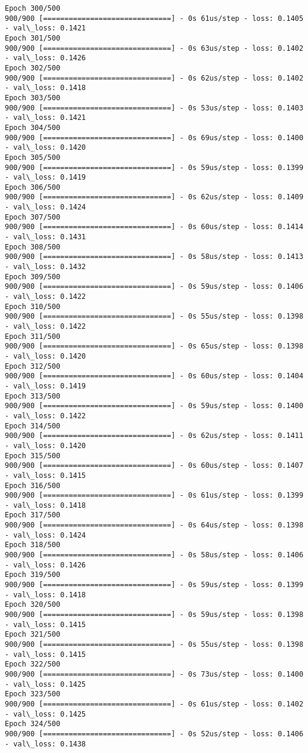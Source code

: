 \documentclass[11pt]{article}
\begin{document}
\begin{Verbatim}[commandchars=\\\{\}]
Epoch 300/500
900/900 [==============================] - 0s 61us/step - loss: 0.1405 - val\_loss: 0.1421
Epoch 301/500
900/900 [==============================] - 0s 63us/step - loss: 0.1402 - val\_loss: 0.1426
Epoch 302/500
900/900 [==============================] - 0s 62us/step - loss: 0.1402 - val\_loss: 0.1418
Epoch 303/500
900/900 [==============================] - 0s 53us/step - loss: 0.1403 - val\_loss: 0.1421
Epoch 304/500
900/900 [==============================] - 0s 69us/step - loss: 0.1400 - val\_loss: 0.1420
Epoch 305/500
900/900 [==============================] - 0s 59us/step - loss: 0.1399 - val\_loss: 0.1419
Epoch 306/500
900/900 [==============================] - 0s 62us/step - loss: 0.1409 - val\_loss: 0.1424
Epoch 307/500
900/900 [==============================] - 0s 60us/step - loss: 0.1414 - val\_loss: 0.1431
Epoch 308/500
900/900 [==============================] - 0s 58us/step - loss: 0.1413 - val\_loss: 0.1432
Epoch 309/500
900/900 [==============================] - 0s 59us/step - loss: 0.1406 - val\_loss: 0.1422
Epoch 310/500
900/900 [==============================] - 0s 55us/step - loss: 0.1398 - val\_loss: 0.1422
Epoch 311/500
900/900 [==============================] - 0s 65us/step - loss: 0.1398 - val\_loss: 0.1420
Epoch 312/500
900/900 [==============================] - 0s 60us/step - loss: 0.1404 - val\_loss: 0.1419
Epoch 313/500
900/900 [==============================] - 0s 59us/step - loss: 0.1400 - val\_loss: 0.1422
Epoch 314/500
900/900 [==============================] - 0s 62us/step - loss: 0.1411 - val\_loss: 0.1420
Epoch 315/500
900/900 [==============================] - 0s 60us/step - loss: 0.1407 - val\_loss: 0.1415
Epoch 316/500
900/900 [==============================] - 0s 61us/step - loss: 0.1399 - val\_loss: 0.1418
Epoch 317/500
900/900 [==============================] - 0s 64us/step - loss: 0.1398 - val\_loss: 0.1424
Epoch 318/500
900/900 [==============================] - 0s 58us/step - loss: 0.1406 - val\_loss: 0.1426
Epoch 319/500
900/900 [==============================] - 0s 59us/step - loss: 0.1399 - val\_loss: 0.1418
Epoch 320/500
900/900 [==============================] - 0s 59us/step - loss: 0.1398 - val\_loss: 0.1415
Epoch 321/500
900/900 [==============================] - 0s 55us/step - loss: 0.1398 - val\_loss: 0.1415
Epoch 322/500
900/900 [==============================] - 0s 73us/step - loss: 0.1400 - val\_loss: 0.1425
Epoch 323/500
900/900 [==============================] - 0s 61us/step - loss: 0.1402 - val\_loss: 0.1425
Epoch 324/500
900/900 [==============================] - 0s 52us/step - loss: 0.1406 - val\_loss: 0.1438

\end{Verbatim}
\end{document}
